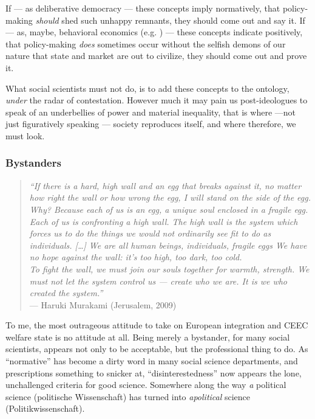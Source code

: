 \documentclass[11pt,a4paper,oneside]{article}
\begin{document}
If --- as deliberative democracy \citep[e.g.][]{Elster-1998-aa} --- these concepts imply normatively, that policy-making \emph{should} shed such unhappy remnants, they should come out and say it. 
If --- as, maybe, behavioral economics (e.g. \citealt{Tomasello2009}) --- these concepts indicate positively, that policy-making \emph{does} sometimes occur without the selfish demons of our nature that state and market are out to civilize, they should come out and prove it. 

What social scientists must not do, is to add these concepts to the ontology, \emph{under} the radar of contestation. 
However much it may pain us post-ideologues to speak of \citeauthor{Agnoli-1989-aa}an underbellies of power and material inequality, that is where ---not just figuratively speaking --- society reproduces itself, and where therefore, we must look.

\subsubsection{Bystanders}

\begin{quote}
	\emph{``If there is a hard, high wall and an egg that breaks against it, no matter how right the wall or how wrong the egg, I will stand on the side of the egg. \\
	Why? 
	Because each of us is an egg, a unique soul enclosed in a fragile egg. 
	Each of us is confronting a high wall. 
	The high wall is the system which forces us to do the things we would not ordinarily see fit to do as individuals. 
	[\ldots] 
	We are all human beings, individuals, fragile eggs
	We have no hope against the wall: 
	it's too high, too dark, too cold. \\
	To fight the wall, we must join our souls together for warmth, strength. 
	We must not let the system control us --- create who we are. It is we who created the system.''}\\
	--- Haruki Murakami (Jerusalem, 2009)
\end{quote}

To me, the most outrageous attitude to take on European integration and \gls{CEEC} welfare state is no attitude at all. 
Being merely a bystander, for many social scientists, appears not only to be acceptable, but the professional thing to do. 
As ``normative'' has become a dirty word in many social science departments, and prescriptions something to snicker at, ``disinterestedness'' now appears the lone, unchallenged criteria for good science. 
Somewhere along the way \emph{a} political science (politische Wissenschaft) has turned into \emph{apolitical} science (Politikwissenschaft).
\end{document}
